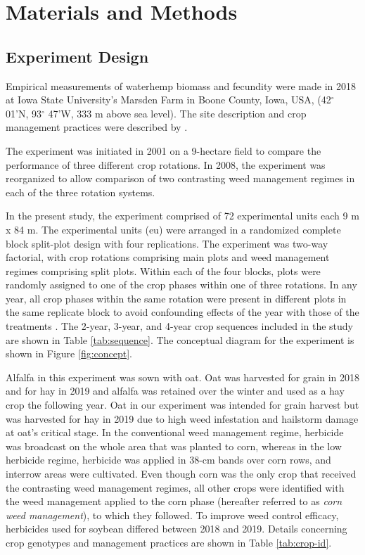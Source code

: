 \documentclass[
]{article}
\begin{document}
\hypertarget{materials-and-methods}{%
\section*{Materials and Methods}\label{materials-and-methods}}

\hypertarget{experiment-design}{%
\subsection*{Experiment Design}\label{experiment-design}}

Empirical measurements of waterhemp biomass and fecundity were made in 2018 at Iowa State University's Marsden Farm in Boone County, Iowa, USA, (42\(^\circ\) 01'N, 93\(^\circ\) 47'W, 333 m above sea level). The site description and crop management practices were described by \citet{liebmanWeedSeedbankDiversity2021}.

The experiment was initiated in 2001 on a 9-hectare field to compare the performance of three different crop rotations. In 2008, the experiment was reorganized to allow comparison of two contrasting weed management regimes in each of the three rotation systems.

In the present study, the experiment comprised of 72 experimental units each 9 m x 84 m. The experimental units (eu) were arranged in a randomized complete block split-plot design with four replications. The experiment was two-way factorial, with crop rotations comprising main plots and weed management regimes comprising split plots. Within each of the four blocks, plots were randomly assigned to one of the crop phases within one of three rotations. In any year, all crop phases within the same rotation were present in different plots in the same replicate block to avoid confounding effects of the year with those of the treatments \citep{payneDesignAnalysisLong2015}. The 2-year, 3-year, and 4-year crop sequences included in the study are shown in Table \ref{tab:sequence}. The conceptual diagram for the experiment is shown in Figure \ref{fig:concept}.

Alfalfa in this experiment was sown with oat. Oat was harvested for grain in 2018 and for hay in 2019 and alfalfa was retained over the winter and used as a hay crop the following year. Oat in our experiment was intended for grain harvest but was harvested for hay in 2019 due to high weed infestation and hailstorm damage at oat's critical stage. In the conventional weed management regime, herbicide was broadcast on the whole area that was planted to corn, whereas in the low herbicide regime, herbicide was applied in 38-cm bands over corn rows, and interrow areas were cultivated. Even though corn was the only crop that received the contrasting weed management regimes, all other crops were identified with the weed management applied to the corn phase (hereafter referred to as \emph{corn weed management}), to which they followed. To improve weed control efficacy, herbicides used for soybean differed between 2018 and 2019. Details concerning crop genotypes and management practices are shown in Table \ref{tab:crop-id}.
\end{document}
